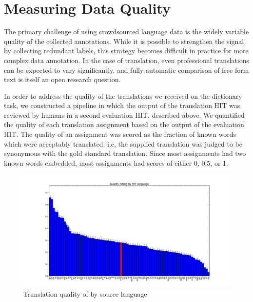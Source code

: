 \documentclass[11pt]{article}
\begin{document}
\section{Measuring Data Quality}
The primary challenge of using crowdsourced language data is the widely variable quality of the collected annotations. While it is possible to strengthen the signal by collecting redundant labels, this strategy becomes difficult in practice for more complex data annotation. In the case of translation, even professional translations can be expected to vary significantly, and fully automatic comparison of free form text is itself an open research question.

 
In order to address the quality of the translations we received on the dictionary task, we constructed a pipeline in which the output of the translation HIT was reviewed by humans in a second evaluation HIT, described above. We quantified the quality of each translation assignment based on the output of the evaluation HIT. The quality of an assignment was scored as the fraction of known words which were acceptably translated: i.e, the supplied translation was judged to be synonymous with the gold standard translation. Since most assignments had two known words embedded, most assignments had scores of either 0, 0.5, or 1.



\begin{figure}[h]
\centering
\includegraphics[width=6in]{figures/quality-hitlang}
\caption{Translation quality of by source language}
\label{hitlangqual-bar}
\end{figure}
\end{document}
